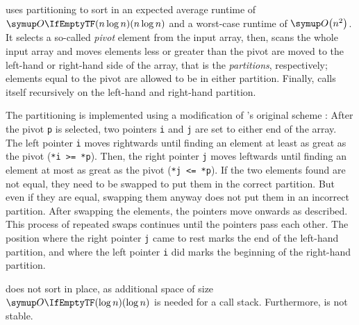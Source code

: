 \section{\texorpdfstring{\QS{}}{QuickSort}}
\label{sec:tasklet:quick}

\QS{} \cites{hoare1962quicksort}[88-91]{maurer1974datenstrukturen}[Chapter~2.2.6]{wirth1975algorithmen} uses partitioning to sort in an expected average runtime of \(\bigoh{n \log n}\) and a worst-case runtime of \(\bigoh*{n^2}\).
It selects a so-called \emph{pivot} element from the input array, then, scans the whole input array and moves elements less or greater than the pivot are moved to the left-hand or right-hand side of the array, that is the \emph{partitions}, respectively;
elements equal to the pivot are allowed to be in either partition.
Finally, \QS{} calls itself recursively on the left-hand and right-hand partition.

The partitioning is implemented using a modification of \citeauthor{hoare1962quicksort}'s original scheme \cite{hoare1962quicksort}:
After the pivot \lstinline|p| is selected, two pointers \lstinline|i| and \lstinline|j| are set to either end of the array.
The left pointer \lstinline|i| moves rightwards until finding an element at least as great as the pivot (\lstinline|*i >= *p|).
Then, the right pointer \lstinline|j| moves leftwards until finding an element at most as great as the pivot (\lstinline|*j <= *p|).
If the two elements found are not equal, they need to be swapped to put them in the correct partition.
But even if they are equal, swapping them anyway does not put them in an incorrect partition.
After swapping the elements, the pointers move onwards as described.
This process of repeated swaps continues until the pointers pass each other.
The position where the right pointer \lstinline|j| came to rest marks the end of the left-hand partition, and where the left pointer \lstinline|i| did marks the beginning of the right-hand partition.

\QS{} does not sort in place, as additional space of size \(\bigoh{\log n}\) is needed for a call stack.
Furthermore, \QS{} is not stable.






